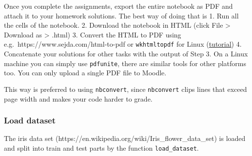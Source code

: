 Once you complete the assignments, export the entire notebook as PDF and
attach it to your homework solutions. The best way of doing that is 1.
Run all the cells of the notebook. 2. Download the notebook in HTML
(click File \textgreater{} Download as \textgreater{} .html) 3. Convert
the HTML to PDF using e.g.~https://www.sejda.com/html-to-pdf or
\texttt{wkhtmltopdf} for Linux
(\href{https://www.cyberciti.biz/open-source/html-to-pdf-freeware-linux-osx-windows-software/}{tutorial})
4. Concatenate your solutions for other tasks with the output of Step 3.
On a Linux machine you can simply use \texttt{pdfunite}, there are
similar tools for other platforms too. You can only upload a single PDF
file to Moodle.

This way is preferred to using \texttt{nbconvert}, since
\texttt{nbconvert} clips lines that exceed page width and makes your
code harder to grade.

    \hypertarget{load-dataset}{%
\subsubsection{Load dataset}\label{load-dataset}}

The iris data set
(https://en.wikipedia.org/wiki/Iris\_flower\_data\_set) is loaded and
split into train and test parts by the function \texttt{load\_dataset}.

